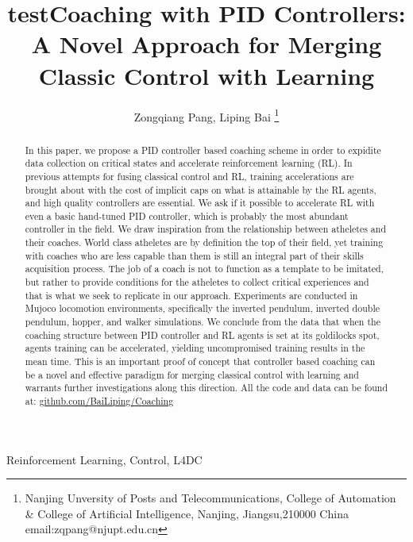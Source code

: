 \documentclass[journal]{IEEEtran}
\begin{document}
    \title{test}
\title{Coaching with PID Controllers: A Novel Approach for Merging Classic Control with Learning}

\author{ Zongqiang Pang, Liping Bai \thanks{Nanjing Unversity of Posts and Telecommunications, College of Automation \& College of Artificial Intelligence, Nanjing, Jiangsu,210000 China email:zqpang@njupt.edu.cn}}
\maketitle
\begin{abstract}
In this paper, we propose a PID controller based coaching scheme in order to expidite data collection on critical states and accelerate reinforcement learning (RL). In previous attempts for fusing classical control and RL, training accelerations are brought about with the cost of implicit caps on what is attainable by the RL agents, and high quality controllers are essential. We ask if it possible to accelerate RL with even a basic hand-tuned PID controller, which is probably the most abundant controller in the field. We draw inspiration from the relationship between atheletes and their coaches. World class atheletes are by definition the top of their field, yet training with coaches who are less capable than them is still an integral part of their skills acquisition process. The job of a coach is not to function as a template to be imitated, but rather to provide conditions for the atheletes to collect critical experiences and that is what we seek to replicate in our approach. Experiments are conducted in Mujoco locomotion environments, specifically the inverted pendulum, inverted double pendulum, hopper, and walker simulations. We conclude from the data that when the coaching structure between PID controller and RL agents is set at its goldilocks spot, agents training can be accelerated, yielding uncompromised training results in the mean time. This is an important proof of concept that controller based coaching can be a novel and effective paradigm for merging classical control with learning and warrants further investigations along this direction. All the code and data can be found at: \href{https://github.com/BaiLiping/Coaching}{github.com/BaiLiping/Coaching}
\end{abstract}
\begin{IEEEkeywords}
Reinforcement Learning, Control, L4DC
\end{IEEEkeywords}
\IEEEpeerreviewmaketitle
\end{document}
